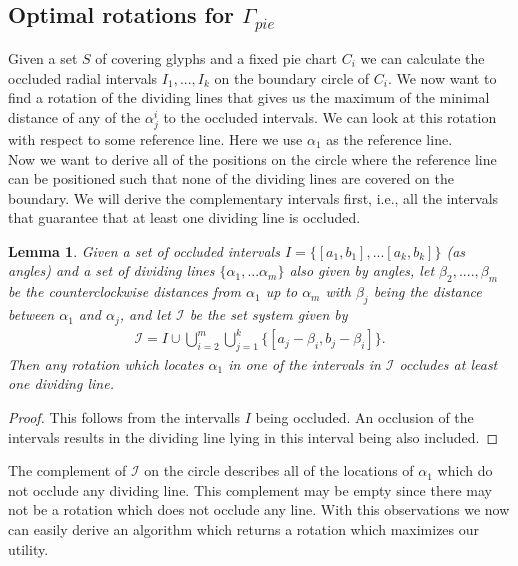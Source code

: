 \documentclass[a4paper,11pt]{article}
\newtheorem{lemma}{Lemma}
\begin{document}
\subsection*{Optimal rotations for $\Gamma_{pie}$}

Given a set $S$ of covering glyphs and a fixed pie chart $C_i$ we can calculate the occluded radial intervals $I_1,...,I_k$ on the boundary circle of $C_i$. We now want to find a rotation of the dividing lines that gives us the maximum of the minimal distance of any of the $\alpha^i_j$ to the occluded intervals. We can look at this rotation with respect to some reference line. Here we use $\alpha_1$ as the reference line.\\

Now we want to derive all of the positions on the circle where the reference line can be positioned such that none of the dividing lines are covered on the boundary. We will derive the complementary intervals first, i.e., all the intervals that guarantee that at least one dividing line is occluded.

\begin{lemma}
  Given a set of occluded intervals $I=\{[a_1,b_1],...[a_k,b_k]\}$ (as angles) and a set of dividing lines $\{\alpha_1,...\alpha_m\}$ also given by angles, let $\beta_2,....,\beta_m$ be the counterclockwise distances from $\alpha_1$ up to $\alpha_m$ with $\beta_j$ being the distance between $\alpha_1$ and $\alpha_j$, and let $\mathcal{I}$ be the set system given by
  \begin{align*}
    \mathcal{I}=I \cup \bigcup_{i=2}^m    \bigcup_{j=1}^k \{ [a_j-\beta_i,b_j-\beta_i]   \}.
  \end{align*}
  Then any rotation which locates $\alpha_1$ in one of the intervals in $\mathcal{I}$ occludes at least one dividing line.
\end{lemma}

\begin{proof}
  This follows from the intervalls $I$ being occluded. An occlusion of the intervals results in the dividing line lying in this interval being also included.
\end{proof}

The complement of $\mathcal{I}$ on the circle describes all of the locations of $\alpha_1$ which do not occlude any dividing line. This complement may be empty since there may not be a rotation which does not occlude any line. With this observations we now can easily derive an algorithm which returns a rotation which maximizes our utility.
\end{document}
